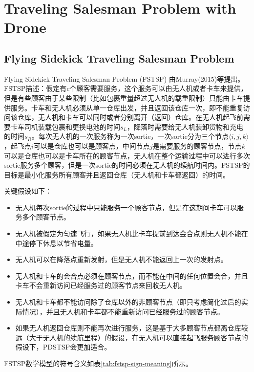 \chapter{Traveling Salesman Problem with Drone}

\section{Flying Sidekick Traveling Salesman Problem}
Flying Sidekick Traveling Salesman Problem (FSTSP) 由Murray(2015)等\cite{murrayFlyingSidekickTraveling2015}提出。FSTSP描述：假定有$c$个顾客需要服务，这个服务可以由无人机或者卡车来提供，但是有些顾客由于某些限制（比如包裹重量超过无人机的载重限制）只能由卡车提供服务。卡车和无人机必须从单一仓库出发，并且返回该仓库一次，即不能重复访问该仓库，无人机和卡车可以同时或者分别离开（返回）仓库。在无人机起飞前需要卡车司机装载包裹和更换电池的时间$s_L$，降落时需要给无人机装卸货物和充电的时间$s_R$。每次无人机的一次服务称为一次sortie，一次sortie分为三个节点$\langle i,j,k \rangle$，起飞点$i$可以是仓库也可以是顾客点，中间节点$j$是需要服务的顾客节点，节点$k$可以是仓库也可以是卡车所在的顾客节点，无人机在整个运输过程中可以进行多次sortie服务多个顾客，但是一次sortie的时间必须在无人机的续航时间内。FSTSP的目标是最小化服务所有顾客并且返回仓库（无人机和卡车都返回）的时间。

关键假设如下：
\begin{itemize}
    \item 无人机每次sortie的过程中只能服务一个顾客节点，但是在这期间卡车可以服务多个顾客节点。
    \item 无人机被假定为匀速飞行，如果无人机比卡车提前到达会合点则无人机不能在中途停下休息以节省电量。
    \item 无人机可以在降落点重新发射，但是无人机不能返回上一次的发射点。
    \item 无人机和卡车的会合点必须在顾客节点，而不能在中间的任何位置会合，并且卡车不会重新访问已经服务过的顾客节点来回收无人机。
    \item 无人机和卡车都不能访问除了仓库以外的非顾客节点（即只考虑简化过后的实际情况），并且无人机和卡车都不能重新访问已经服务过的顾客节点。
    \item 如果无人机返回仓库则不能再次进行服务，这是基于大多顾客节点都离仓库较远（大于无人机的续航里程）的假设，在无人机可以直接起飞服务顾客节点的假设下，PDSTSP会更加适合。
\end{itemize}

FSTSP数学模型的符号含义如表\ref{tab:fstsp-sign-meaning}所示。


